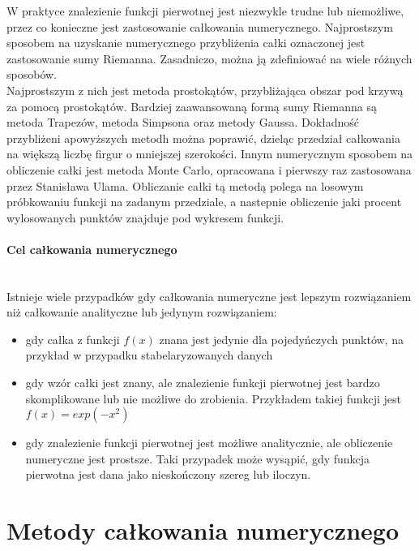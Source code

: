 \documentclass[12pt,twoside]{article}
\begin{document}
W praktyce znalezienie funkcji pierwotnej jest niezwykle trudne lub niemożliwe, przez co konieczne jest zastosowanie całkowania numerycznego.
Najprostszym sposobem na uzyskanie numerycznego przybliżenia całki oznaczonej jest zastosowanie sumy Riemanna.
Zasadniczo, można ją zdefiniować na wiele różnych sposobów.\\
Najprostszym z nich jest metoda prostokątów, przybliżająca obszar pod krzywą za pomocą prostokątów.
Bardziej zaawansowaną formą sumy Riemanna są metoda Trapezów, metoda Simpsona oraz metody Gaussa.
Dokładność przybliżeni apowyższych metodh można poprawić, dzieląc przedział całkowania na większą liczbę firgur o mniejszej szerokości.
\newline
Innym numerycznym sposobem na obliczenie całki jest metoda Monte Carlo, opracowana i pierwszy raz zastosowana przez Stanisława Ulama.
Obliczanie całki tą metodą polega na losowym próbkowaniu funkcji na zadanym przedziale, a nastepnie obliczenie jaki procent wylosowanych punktów znajduje pod wykresem funkcji.\cite{Intro_1}

\paragraph{Cel całkowania numerycznego}\mbox{} \\

Istnieje wiele przypadków gdy całkowania numeryczne jest lepszym rozwiązaniem niż całkowanie analityczne lub jedynym rozwiązaniem:
\begin{itemize}
	\item gdy całka z funkcji $f(x)$ znana jest jedynie dla pojedyńczych punktów, na przykład w przypadku stabelaryzowanych danych
	\item gdy wzór całki jest znany, ale znalezienie funkcji pierwotnej jest bardzo skomplikowane lub nie możliwe do zrobienia. Przykładem takiej funkcji jest $f(x) = exp(-x^2)$
	\item gdy znalezienie funkcji pierwotnej jest możliwe analitycznie, ale obliczenie numeryczne jest prostsze. Taki przypadek może wysąpić, gdy funkcja pierwotna jest dana jako nieskończony szereg lub iloczyn.
\end{itemize}
\cite{Intro_2}

\clearpage

\section{Metody całkowania numerycznego}
\end{document}

